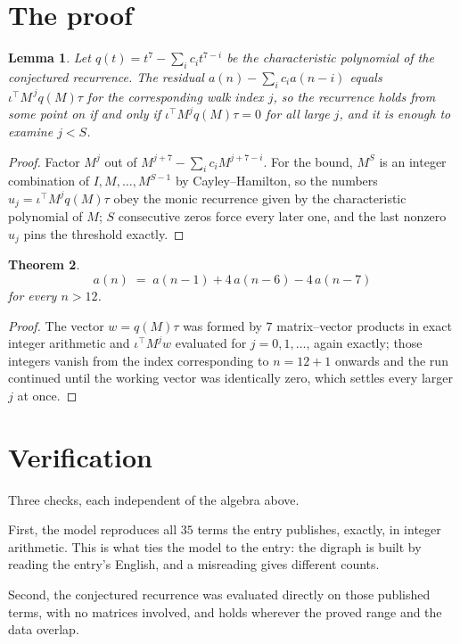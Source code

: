 \documentclass[11pt,a4paper]{article}
\theoremstyle{plain}
\newtheorem{theorem}{Theorem}
\newtheorem{lemma}[theorem]{Lemma}
\theoremstyle{definition}
\begin{document}
\section{The proof}

\begin{lemma}\label{lem:crit}
Let $q(t)=t^{7}-\sum_i c_it^{7-i}$ be the characteristic polynomial of the
conjectured recurrence. The residual $a(n)-\sum_ic_ia(n-i)$ equals
$\iota^{\!\top}M^{\,j}q(M)\tau$ for the corresponding walk index $j$, so the recurrence
holds from some point on if and only if $\iota^{\!\top}M^{j}q(M)\tau=0$ for all large $j$,
and it is enough to examine $j<S$.
\end{lemma}

\begin{proof}
Factor $M^{j}$ out of $M^{j+7}-\sum_ic_iM^{j+7-i}$. For the bound, $M^{S}$
is an integer combination of $I,M,\dots,M^{S-1}$ by Cayley--Hamilton, so the numbers
$u_j=\iota^{\!\top}M^{j}q(M)\tau$ obey the monic recurrence given by the characteristic
polynomial of $M$; $S$ consecutive zeros force every later one, and the last nonzero $u_j$
pins the threshold exactly.
\end{proof}

\begin{theorem}
\[
a(n)\;=\;a(n-1) + 4\,a(n-6) - 4\,a(n-7)
\]
for every $n>12$.
\end{theorem}

\begin{proof}
The vector $w=q(M)\tau$ was formed by $7$ matrix--vector products in exact integer
arithmetic and $\iota^{\!\top}M^{j}w$ evaluated for $j=0,1,\dots$, again exactly; those
integers vanish from the index corresponding to $n=12+1$ onwards and the run continued
until the working vector was identically zero, which settles every larger $j$ at once.
\end{proof}

\section{Verification}

Three checks, each independent of the algebra above.

First, the model reproduces all $35$ terms the entry publishes, exactly, in integer
arithmetic. This is what ties the model to the entry: the digraph is built by reading the
entry's English, and a misreading gives different counts.

Second, the conjectured recurrence was evaluated directly on those published terms, with no
matrices involved, and holds wherever the proved range and the data overlap.
\end{document}
